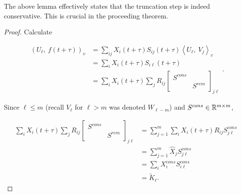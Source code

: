 The above lemma effectively states that the truncation step is indeed 
conservative. This is crucial in the proceeding theorem. 

\begin{proof}
    Calculate

    \begin{equation}
        \begin{split}
            \left( U_\ell,\ f(t + \tau) \right)_v 
            &= \sum_{i j} X_i (t + \tau) S_{i j} (t + \tau) 
                \left\langle U_\ell,\ V_j \right\rangle_v \\ 
            &= \sum_i X_i (t + \tau) S_{i \ell} (t + \tau) \\
            &= \sum_i X_i (t + \tau) \sum_j R_{i j} \begin{bmatrix}
                S^{cons} & \\ 
                & S^{rem} 
            \end{bmatrix}_{j \ell}
        \end{split} . 
    \end{equation}

    Since $\ell \leq m$ (recall $V_\ell$ for $\ell > m$ was denoted $W_{\ell - m}$) 
    and $S^{cons} \in \mathbb{R}^{m \times m}$, 

    \begin{equation}
        \begin{split}
            \sum_i X_i (t + \tau) \sum_j R_{i j} \begin{bmatrix}
                S^{cons} & \\ 
                & S^{rem} 
            \end{bmatrix}_{j \ell}
            &= \sum_{j=1}^m \sum_i X_i (t + \tau) R_{i j} S^{cons}_{j \ell} \\ 
            &= \sum_{j=1}^m \widehat{ X }_j S^{cons}_{j \ell} \\ 
            &= \sum_i X^{cons}_i S^{cons}_{i \ell} \\ 
            &= \widetilde{ K }_\ell . 
        \end{split} 
    \end{equation}
\end{proof}

